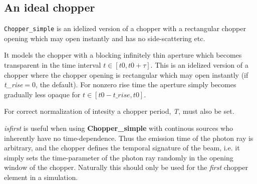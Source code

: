 \subsection*{An ideal chopper}
\texttt{Chopper\_simple} is an idelized version of a chopper with a rectangular chopper opening which may open
instantly and has no side-scattering etc.

It models the chopper with a blocking infinitely thin aperture which becomes transparent
in the time interval $t\in\left[\mathit{t0},\mathit{t0}+\tau\right]$.
This is an idelized version of a chopper where the chopper opening is rectangular which may open
instantly (if \textit{t\_rise}$=0$, the default). For nonzero rise time the aperture simply becomes gradually less opaque
for $t\in\left[\mathit{t0}-\textit{t\_rise},\mathit{t0}\right]$.

For correct normalization of intesity a chopper period, \textit{T}, must also be set.

\textit{isfirst} is useful when using \textbf{Chopper\_simple} with continous sources who inherently have no time-dependence. Thus the emission time of the photon
ray is arbitrary, and the chopper defines the temporal signature of the beam,
i.e. it simply sets the time-parameter of the photon ray randomly in the
opening window of the chopper. Naturally this should only be used for the \emph{first} chopper
element in a simulation.
